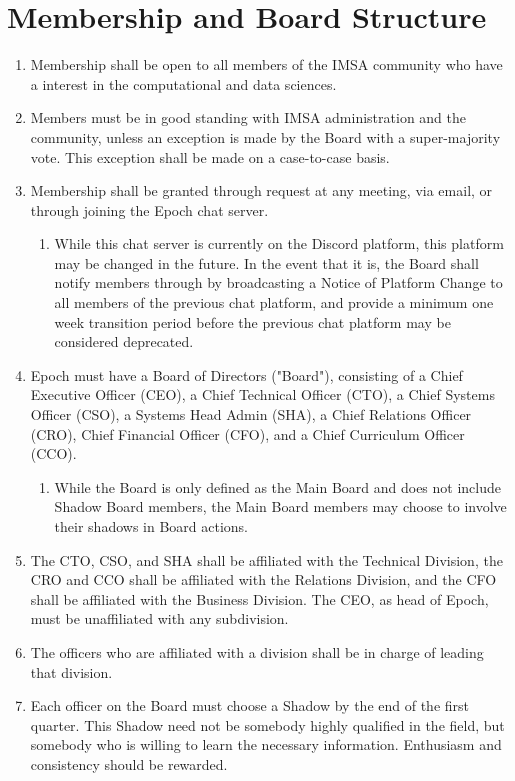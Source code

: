 \documentclass{article}
\begin{document}
\section{Membership and Board Structure}
\begin{enumerate}
    \item Membership shall be open to all members of the IMSA community who have a interest in the computational and data sciences. 
    \item Members must be in good standing with IMSA administration and the community, unless an exception is made by the Board with a super-majority vote. This exception shall be made on a case-to-case basis.
    \item Membership shall be granted through request at any meeting, via email, or through joining the Epoch chat server.
    \begin{enumerate}
        \item While this chat server is currently on the Discord platform, this platform may be changed in the future. In the event that it is, the Board shall notify members through by broadcasting a Notice of Platform Change to all members of the previous chat platform, and provide a minimum one week transition period before the previous chat platform may be considered deprecated.
    \end{enumerate}
    \item Epoch must have a Board of Directors ("Board"), consisting of a Chief Executive Officer (CEO), a Chief Technical Officer (CTO), a Chief Systems Officer (CSO), a Systems Head Admin (SHA), a Chief Relations Officer (CRO), Chief Financial Officer (CFO), and a Chief Curriculum Officer (CCO).
    \begin{enumerate}
        \item While the Board is only defined as the Main Board and does not include Shadow Board members, the Main Board members may choose to involve their shadows in Board actions. 
    \end{enumerate}
    \item The CTO, CSO, and SHA shall be affiliated with the Technical Division, the CRO and CCO shall be affiliated with the Relations Division, and the CFO shall be affiliated with the Business Division. The CEO, as head of Epoch, must be unaffiliated with any subdivision.
    \item The officers who are affiliated with a division shall be in charge of leading that division.
    \item Each officer on the Board must choose a Shadow by the end of the first quarter. This Shadow need not be somebody highly qualified in the field, but somebody who is willing to learn the necessary information. Enthusiasm and consistency should be rewarded.

\end{enumerate}
\end{document}
